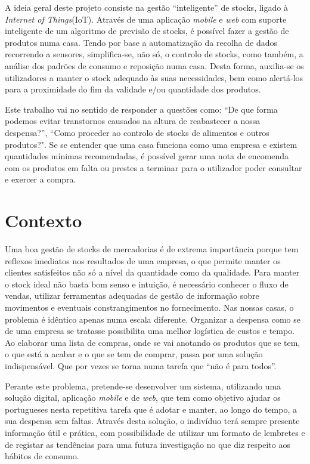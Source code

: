 A ideia geral deste projeto consiste na gestão ``inteligente'' de stocks, ligado à \textit{Internet of Things}(IoT). Através de uma aplicação \textit{mobile} e \textit{web} com suporte inteligente de um algoritmo de previsão de stocks, é possível fazer a gestão de produtos numa casa. Tendo por base a automatização da recolha de dados recorrendo a sensores, simplifica-se, não só, o controlo de stocks, como também, a análise dos padrões de consumo e reposição numa casa.
Desta forma, auxilia-se os utilizadores a manter o stock adequado às suas necessidades, bem como alertá-los para a proximidade do fim da validade e/ou quantidade dos produtos. 

Este trabalho vai no sentido de responder a questões como: ``De que forma podemos evitar transtornos causados na altura de reabastecer a nossa despensa?'', ``Como proceder ao controlo de stocks de alimentos e outros produtos?". Se se entender que uma casa funciona como uma empresa e existem quantidades mínimas recomendadas, é possível gerar uma nota de encomenda com os produtos em falta ou prestes a terminar para o utilizador poder consultar e exercer a compra.

%
%
\section{Contexto} \label{sec11}

Uma boa gestão de stocks de mercadorias é de extrema importância porque tem reflexos imediatos nos resultados de uma empresa, o que permite manter os clientes satisfeitos não só a nível da quantidade como da qualidade. Para manter o stock ideal não basta bom senso e intuição, é necessário conhecer o fluxo de vendas, utilizar ferramentas adequadas de gestão de informação sobre movimentos e eventuais constrangimentos no fornecimento. Nas nossas casas, o problema é idêntico apenas numa escala diferente. Organizar a despensa como se de uma empresa se tratasse possibilita uma melhor logística de custos e tempo. Ao elaborar uma lista de compras, onde se vai anotando os produtos que se tem, o que está a acabar e o que se tem de comprar, passa por uma solução indispensável. Que por vezes se torna numa tarefa que ``não é para todos''.

Perante este problema, pretende-se desenvolver um sistema, utilizando uma solução digital, aplicação \textit{mobile} e de \textit{web}, que tem como objetivo ajudar os portugueses nesta repetitiva tarefa que é adotar e manter, ao longo do tempo, a sua despensa sem faltas.
Através desta solução, o indivíduo terá sempre presente informação útil e prática, com possibilidade de utilizar um formato de lembretes e de registar as tendências para uma futura investigação no que diz respeito aos hábitos de consumo.

